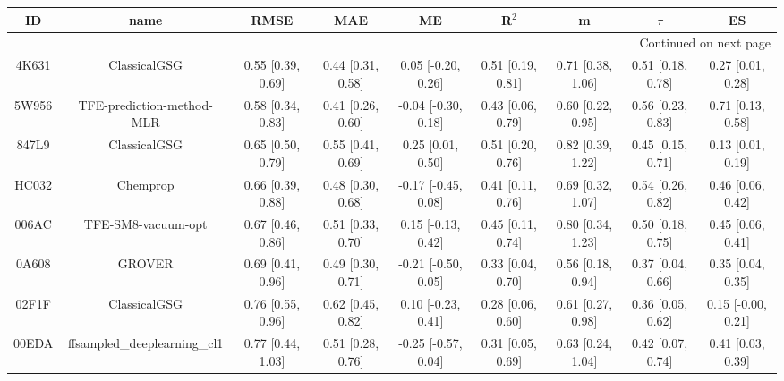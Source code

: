 \documentclass{article}
\begin{document}
\begin{center}
\scriptsize
\begin{longtable}{|ccccccccc|}
\toprule
    ID &                                               name &               RMSE &                MAE &                    ME &              R$^2$ &                     m &                $\tau$ &                    ES \\
\midrule
\endhead
\midrule
\multicolumn{9}{r}{{Continued on next page}} \\
\midrule
\endfoot

\bottomrule
\endlastfoot
 4K631 &                                       ClassicalGSG &  0.55 [0.39, 0.69] &  0.44 [0.31, 0.58] &    0.05 [-0.20, 0.26] &  0.51 [0.19, 0.81] &     0.71 [0.38, 1.06] &     0.51 [0.18, 0.78] &     0.27 [0.01, 0.28] \\
 5W956 &                          TFE-prediction-method-MLR &  0.58 [0.34, 0.83] &  0.41 [0.26, 0.60] &   -0.04 [-0.30, 0.18] &  0.43 [0.06, 0.79] &     0.60 [0.22, 0.95] &     0.56 [0.23, 0.83] &     0.71 [0.13, 0.58] \\
 847L9 &                                       ClassicalGSG &  0.65 [0.50, 0.79] &  0.55 [0.41, 0.69] &     0.25 [0.01, 0.50] &  0.51 [0.20, 0.76] &     0.82 [0.39, 1.22] &     0.45 [0.15, 0.71] &     0.13 [0.01, 0.19] \\
 HC032 &                                           Chemprop &  0.66 [0.39, 0.88] &  0.48 [0.30, 0.68] &   -0.17 [-0.45, 0.08] &  0.41 [0.11, 0.76] &     0.69 [0.32, 1.07] &     0.54 [0.26, 0.82] &     0.46 [0.06, 0.42] \\
 006AC &                                 TFE-SM8-vacuum-opt &  0.67 [0.46, 0.86] &  0.51 [0.33, 0.70] &    0.15 [-0.13, 0.42] &  0.45 [0.11, 0.74] &     0.80 [0.34, 1.23] &     0.50 [0.18, 0.75] &     0.45 [0.06, 0.41] \\
 0A608 &                                             GROVER &  0.69 [0.41, 0.96] &  0.49 [0.30, 0.71] &   -0.21 [-0.50, 0.05] &  0.33 [0.04, 0.70] &     0.56 [0.18, 0.94] &     0.37 [0.04, 0.66] &     0.35 [0.04, 0.35] \\
 02F1F &                                       ClassicalGSG &  0.76 [0.55, 0.96] &  0.62 [0.45, 0.82] &    0.10 [-0.23, 0.41] &  0.28 [0.06, 0.60] &     0.61 [0.27, 0.98] &     0.36 [0.05, 0.62] &    0.15 [-0.00, 0.21] \\
 00EDA &                       ffsampled\_deeplearning\_cl1 &  0.77 [0.44, 1.03] &  0.51 [0.28, 0.76] &   -0.25 [-0.57, 0.04] &  0.31 [0.05, 0.69] &     0.63 [0.24, 1.04] &     0.42 [0.07, 0.74] &     0.41 [0.03, 0.39] \\

\end{longtable}
\end{center}
\end{document}
